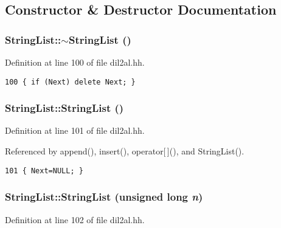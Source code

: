 \subsection{Constructor \& Destructor Documentation}
\subsubsection{\setlength{\rightskip}{0pt plus 5cm}String\-List::$\sim$String\-List ()\hspace{0.3cm}{\tt  [inline]}}\label{classStringList_a0}




Definition at line 100 of file dil2al.hh.



\footnotesize\begin{verbatim}100 { if (Next) delete Next; }
\end{verbatim}\normalsize 
{}
\subsubsection{\setlength{\rightskip}{0pt plus 5cm}String\-List::String\-List ()\hspace{0.3cm}{\tt  [inline]}}\label{classStringList_a1}




Definition at line 101 of file dil2al.hh.

Referenced by append(), insert(), operator[$\,$](), and String\-List().



\footnotesize\begin{verbatim}101 { Next=NULL; }
\end{verbatim}\normalsize 
{}
\subsubsection{\setlength{\rightskip}{0pt plus 5cm}String\-List::String\-List (unsigned long {\em n})\hspace{0.3cm}{\tt  [inline]}}\label{classStringList_a2}




Definition at line 102 of file dil2al.hh.

